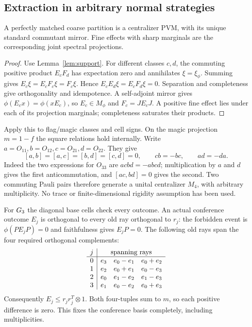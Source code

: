 \subsection{Extraction in arbitrary normal strategies}
\begin{lemma}\label{lem:classes}
A perfectly matched coarse partition is a centralizer PVM, with its unique standard commutant mirror. Fine effects with sharp marginals are the corresponding joint spectral projections.
\end{lemma}
\begin{proof}
Use Lemma~\ref{lem:support}. For different classes $c,d$, the commuting positive product $E_cF_d$ has expectation zero and annihilates $\xi=\xi_\phi$. Summing gives $E_c\xi=E_cF_c\xi=F_c\xi$. Hence $E_cE_d\xi=E_cF_d\xi=0$. Separation and completeness give orthogonality and idempotence. A self-adjoint mirror gives $\phi(E_cx)=\phi(xE_c)$, so $E_c\in M_\phi$ and $F_c=JE_cJ$. A positive fine effect lies under each of its projection marginals; completeness saturates their products.
\end{proof}
Apply this to flag/magic classes and cell signs. On the magic projection $m=1-f$ the square relations hold internally. Write $a=O_{11},b=O_{12},c=O_{21},d=O_{22}$. They give
\[
 [a,b]=[a,c]=[b,d]=[c,d]=0,\qquad cb=-bc,\qquad ad=-da.
\]
Indeed the two expressions for $O_{33}$ are $acbd=-abcd$; multiplication by $a$ and $d$ gives the first anticommutation, and $[ac,bd]=0$ gives the second. Two commuting Pauli pairs therefore generate a unital centralizer $M_4$, with arbitrary multiplicity. No trace or finite-dimensional rigidity assumption has been used.

For $G_3$ the diagonal base cells check every outcome. An actual conference outcome $E_j$ is orthogonal to every old ray orthogonal to $r_j$: the forbidden event is $\phi(PE_jP)=0$ and faithfulness gives $E_jP=0$. The following old rays span the four required orthogonal complements:
\[
\begin{array}{c|ccc}
j&\multicolumn{3}{c}{\text{spanning rays}}\\\hline
0&e_3&e_0-e_1&e_0+e_2\\
1&e_2&e_0+e_1&e_0-e_3\\
2&e_0&e_1-e_2&e_1-e_3\\
3&e_1&e_0-e_2&e_0+e_3
\end{array}
\]
Consequently $E_j\le r_jr_j^T\otimes1$. Both four-tuples sum to $m$, so each positive difference is zero. This fixes the conference basis completely, including multiplicities.

